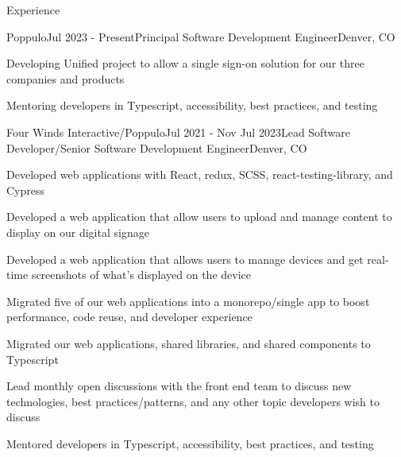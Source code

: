 \documentclass{resume} %
\begin{document}
\begin{rSection}{Experience}

	\begin{rSubsection}{Poppulo}{Jul 2023 - Present}{Principal Software Development Engineer}{Denver, CO}
		\item Developing Unified project to allow a single sign-on solution for our three companies and products
		\item Mentoring developers in Typescript, accessibility, best practices, and testing
	\end{rSubsection}

	\begin{rSubsection}{Four Winds Interactive/Poppulo}{Jul 2021 - Nov Jul 2023}{Lead Software Developer/Senior Software Development Engineer}{Denver, CO}
		\item Developed web applications with React, redux, SCSS, react-testing-library, and Cypress
		\item Developed a web application that allow users to upload and manage content to display on our digital signage
		\item Developed a web application that allows users to manage devices and get real-time screenshots of what's displayed on the device
		\item Migrated five of our web applications into a monorepo/single app to boost performance, code reuse, and developer experience
		\item Migrated our web applications, shared libraries, and shared components to Typescript
		\item Lead monthly open discussions with the front end team to discuss new technologies, best practices/patterns, and any other topic developers wish to discuss
		\item Mentored developers in Typescript, accessibility, best practices, and testing
	\end{rSubsection}


\end{rSection}
\end{document}
